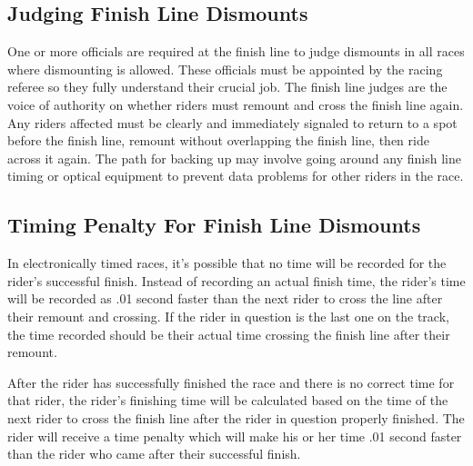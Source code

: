 \subsection{Judging Finish Line Dismounts}
One or more officials are required at the finish line to judge dismounts in all races where dismounting is allowed.
These officials must be appointed by the racing referee so they fully understand their crucial job.
The finish line judges are the voice of authority on whether riders must remount and cross the finish line again.
Any riders affected must be clearly and immediately signaled to return to a spot before the finish line, remount without overlapping the finish line, then ride across it again.
The path for backing up may involve going around any finish line timing or optical equipment to prevent data problems for other riders in the race.

\subsection{Timing Penalty For Finish Line Dismounts}
In electronically timed races, it's possible that no time will be recorded for the rider's successful finish.
Instead of recording an actual finish time, the rider's time will be recorded as .01 second faster than the next rider to cross the line after their remount and crossing.
If the rider in question is the last one on the track, the time recorded should be their actual time crossing the finish line after their remount.

After the rider has successfully finished the race and there is no correct time for that rider, the rider's finishing time will be calculated based on the time of the next rider to cross the finish line after the rider in question properly finished.
The rider will receive a time penalty which will make his or her time .01 second faster than the rider who came after their successful finish.

